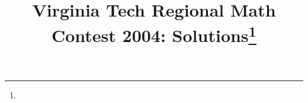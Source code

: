 \documentclass[10pt]{article}
\begin{document}
\title{Virginia Tech Regional Math Contest 2004: Solutions\footnote{\disclaimer}}
\author{\vspace{-2ex}}
\date{\vspace{-5ex}} %
\maketitle

%

%

%

%

%

%

%
\end{document}
